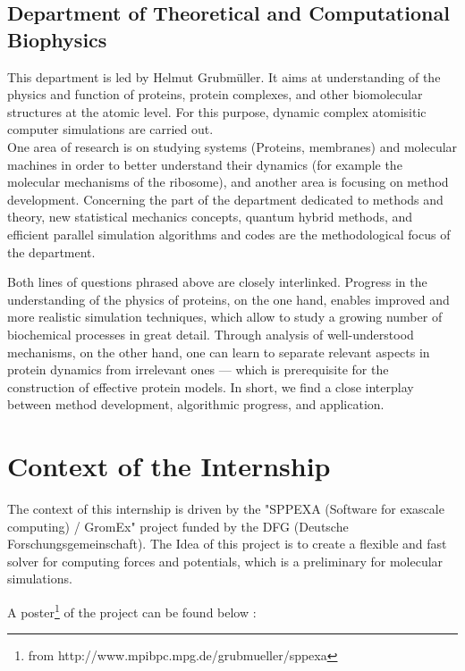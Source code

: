 \documentclass[10pt,twoside,a4paper]{report}
\begin{document}
\section*{Department of Theoretical and Computational Biophysics}

This department is led by Helmut Grubmüller. It aims at understanding of the physics and function of proteins, protein complexes, and other biomolecular structures at the atomic level. For this purpose, dynamic complex atomisitic computer simulations are carried out.\\

One area of research is on studying systems (Proteins, membranes) and molecular machines in order to better understand their dynamics (for example the molecular mechanisms of the ribosome), and another area is focusing on method development.
Concerning the part of the department dedicated to methods and theory, new statistical mechanics concepts, quantum hybrid methods, and efficient parallel simulation algorithms and codes are the methodological focus of the department.

Both lines of questions phrased above are closely interlinked. Progress in the understanding of the physics of proteins, on the one hand, enables improved and more realistic simulation techniques, which allow to study a growing number of biochemical processes in great detail. Through analysis of well-understood mechanisms, on the other hand, one can learn to separate relevant aspects in protein dynamics from irrelevant ones — which is prerequisite for the construction of effective protein models. In short, we find a close interplay between method development, algorithmic progress, and application.  






\chapter{Context of the Internship}

The context of this internship is driven by the "SPPEXA (Software for exascale computing) / GromEx" project funded by the DFG (Deutsche Forschungsgemeinschaft).
The Idea of this project is to create a flexible and fast solver for computing forces and potentials, which is a preliminary for molecular simulations.

A poster\footnote{from http://www.mpibpc.mpg.de/grubmueller/sppexa}   of the project can be found below :
\end{document}
